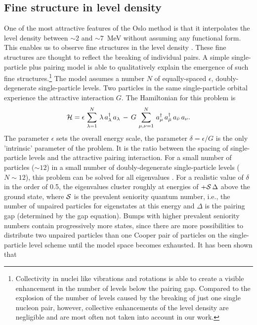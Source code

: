 \documentclass[sort&compress,final,numberedheadings]{aipproc}
\begin{document}
\subsection{Fine structure in level density}

One of the most attractive features of the Oslo method is that it interpolates 
the level density between $\sim 2$ and $\sim 7$~MeV without assuming any 
functional form. This enables us to observe fine structures in the level 
density \cite{TB95,MB99}. These fine structures are thought to reflect the 
breaking of individual pairs. A simple single-particle plus pairing model is 
able to qualitatively explain the emergence of such fine 
structures.\footnote{Collectivity in nuclei like vibrations and rotations is 
able to create a visible enhancement in the number of levels below the pairing
gap. Compared to the explosion of the number of levels caused by the breaking 
of just one single nucleon pair, however, collective enhancements of the level
density are negligible and are most often not taken into account in our work.}
The model assumes a number $N$ of equally-spaced $\epsilon$, doubly-degenerate 
single-particle levels. Two particles in the same single-particle orbital 
experience the attractive interaction $G$. The Hamiltonian for this problem is
\begin{equation}
{\cal{H}}=\epsilon\,\sum_{\lambda=1}^N\,\lambda\,a_\lambda^\dagger\,a_\lambda\,
-\,G\,\sum_{\mu,\nu=1}^N\,a_\mu^\dagger\,a_{\bar{\mu}}^\dagger\,
a_{\bar{\nu}}\,a_\nu.
\end{equation}
The parameter $\epsilon$ sets the overall energy scale, the parameter 
$\delta=\epsilon/G$ is the only 'intrinsic' parameter of the problem. It is 
the ratio between the spacing of single-particle levels and the attractive 
pairing interaction. For a small number of particles ($\sim 12$) in a small 
number of doubly-degenerate single-particle levels ($N\sim 12$), this problem
can be solved for all eigenvalues \cite{GB00}. For a realistic value of 
$\delta$ in the order of 0.5, the eigenvalues cluster roughly at energies of 
$+{\cal{S}}\,\Delta$ above the ground state, where $\cal{S}$ is the prevalent 
seniority quantum number, i.e., the number of unpaired particles for 
eigenstates at this energy and $\Delta$ is the pairing gap (determined by the
gap equation). Bumps with higher prevalent seniority numbers contain 
progressively more states, since there are more possibilities to distribute two
unpaired particles than one Cooper pair of particles on the single-particle 
level scheme until the model space becomes exhausted. It has been shown that 
\end{document}

